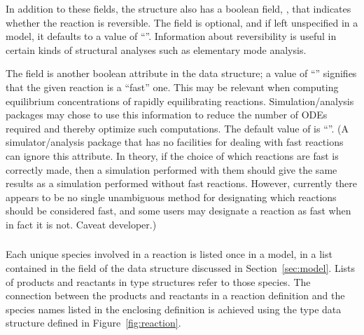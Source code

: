 \documentclass[10pt]{cekarticle}
\newcommand{\vref}[1]{\ref{#1}}
\newcommand{\changed}[1]{\textcolor{BrickRed}{#1}}
\begin{document}
In addition to these fields, the  structure also has a
boolean field, , that indicates whether the reaction is
reversible.  The field is optional, and if left unspecified in a model, it
defaults to a value of ``''.  Information about
reversibility is useful in certain kinds of structural analyses such as
elementary mode analysis.

The field  is another boolean attribute in the
 data structure; a value of ``''
signifies that the given reaction is a ``fast'' one.  This may be relevant
when computing equilibrium concentrations of rapidly equilibrating
reactions.  Simulation/analysis packages may chose to use this information
to reduce the number of ODEs required and thereby optimize such
computations.  The default value of  is
``''.  (A simulator/analysis package that has no
facilities for dealing with fast reactions can ignore this attribute.  In
theory, if the choice of which reactions are fast is correctly made, then a
simulation performed with them should give the same results as a simulation
performed without fast reactions.  However, currently there appears to be
no single unambiguous method for designating which reactions should be
considered fast, and some users may designate a reaction as fast when in
fact it is not.  Caveat developer.)


\subsubsection{\changed{}}
\label{subsec:speciesreference}

Each unique \changed{species} involved in a reaction is listed once in a
model, in a list contained in the \changed{} field of the
 data structure discussed in Section~\ref{sec:model}.  Lists
of products and reactants in  type structures refer to
those species.  The connection between the products and reactants in a
reaction definition and the \changed{species} names listed in the enclosing
 definition is achieved using the
\changed{} type data structure defined in
Figure~\vref{fig:reaction}.
\end{document}

